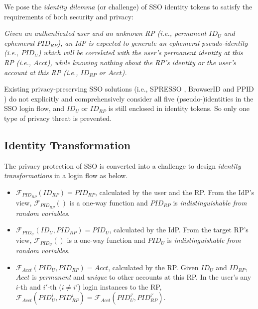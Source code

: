We pose the \emph{identity dilemma} (or challenge) of SSO identity tokens
    to satisfy the requirements of both security and privacy:

\noindent\emph{Given an authenticated user and an unknown RP (i.e., permanent $ID_U$ and ephemeral $PID_{RP}$),
    an IdP is expected to generate an ephemeral pseudo-identity (i.e., $PID_{U}$)
     which will be correlated with the user's permanent identity at this RP (i.e., $Acct$),
     while knowing nothing about the RP's identity or the user's account at this RP (i.e., $ID_{RP}$ or $Acct$).}

Existing privacy-preserving SSO solutions (i.e., SPRESSO \cite{SPRESSO}, BrowserID \cite{BrowserID} and PPID \cite{NIST2017draft})
  do not explicitly and comprehensively consider all five (pseudo-)identities in the SSO login flow,
    and $ID_U$ or $ID_{RP}$ is still enclosed in identity tokens.
So only one type of privacy threat is prevented.

\subsection{Identity Transformation}
\label{subsec:solutions}



The privacy protection of SSO is converted into a challenge
 to design \emph{identity transformations} in a login flow as below.
\vspace{-\topsep}\begin{itemize}
\setlength{\topsep}{0pt}
\setlength{\partopsep}{0pt}
\setlength{\itemsep}{0pt}
\setlength{\parsep}{0pt}
\setlength{\parskip}{0pt}
\item
$\mathcal{F}_{PID_{RP}}(ID_{RP}) = PID_{RP}$, calculated by the user and the RP.
From the IdP's view,
$\mathcal{F}_{PID_{RP}}()$ is a one-way function and $PID_{RP}$
is \emph{indistinguishable from random variables}.
\item
$\mathcal{F}_{PID_U}(ID_U, PID_{RP}) = PID_{U}$, calculated by the IdP.
From the target RP's view,
    $\mathcal{F}_{PID_U}()$ is a one-way function and $PID_{U}$ is \emph{indistinguishable from random variables}.
\item
$\mathcal{F}_{Acct}(PID_{U}, PID_{RP}) = Acct$, calculated by the RP.
Given $ID_U$ and $ID_{RP}$, $Acct$ is \emph{permanent} and \emph{unique} to other accounts at this RP.
In the user's any $i$-th and $i'$-th ($i \neq i'$) login instances to the RP,
 $\mathcal{F}_{Acct}(PID_{U}^i, PID_{RP}^i) = \mathcal{F}_{Acct}(PID_{U}^{i'}, PID_{RP}^{i'})$.
\end{itemize}

